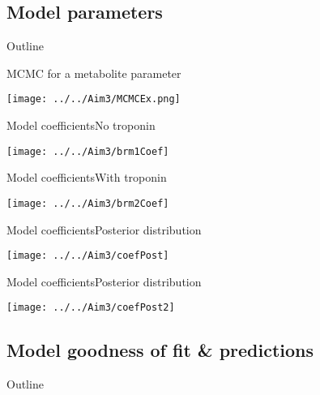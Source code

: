 \documentclass[xcolor=dvipsnames]{beamer}
\begin{document}
\subsection{Model parameters}
\begin{frame}{Outline}
	\vspace{-10.5pt}
	\tableofcontents[currentsection,subsectionstyle=show/shaded/hide]
\end{frame}

\begin{frame}{MCMC for a metabolite parameter}
	\vspace{-5pt}
	\begin{center}
		\texttt{[image: ../../Aim3/MCMCEx.png]}
	\end{center}
\end{frame}


\begin{frame}{Model coefficients}{No troponin}
	\vspace{-5pt}
	\begin{center}
		\texttt{[image: ../../Aim3/brm1Coef]}
	\end{center}
\end{frame}

\begin{frame}{Model coefficients}{With troponin}
	\vspace{-5pt}
	\begin{center}
		\texttt{[image: ../../Aim3/brm2Coef]}
	\end{center}
\end{frame}

\begin{frame}{Model coefficients}{Posterior distribution}
		\vspace{-5pt}
		\begin{center}
			\texttt{[image: ../../Aim3/coefPost]}
		\end{center}
\end{frame}

\begin{frame}{Model coefficients}{Posterior distribution}
	\vspace{-5pt}
	\begin{center}
		\texttt{[image: ../../Aim3/coefPost2]}
	\end{center}
\end{frame}

\subsection{Model goodness of fit \& predictions}
\begin{frame}{Outline}
	\vspace{-10.5pt}
	\tableofcontents[currentsection,subsectionstyle=show/shaded/hide]
\end{frame}
\end{document}
